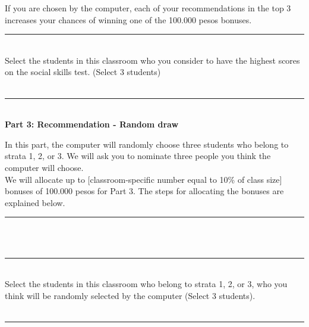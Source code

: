 \documentclass[11pt,a4paper,oneside]{article}
\begin{document}
\noindent If you are chosen by the computer, each of your recommendations in the top 3 increases your chances of winning one of the 100.000 pesos bonuses. \\

\noindent\rule{\textwidth}{0.4pt}\\

\noindent Select the students in this classroom who you consider to have the highest scores on the social skills test. (Select 3 students) \\

\\

\noindent\rule{\textwidth}{0.4pt}\\

\noindent\textbf{Part 3: Recommendation - Random draw}

\noindent In this part, the computer will randomly choose three students who belong to strata 1, 2, or 3. We will ask you to nominate three people you think the computer will choose. \\

\noindent We will allocate up to [classroom-specific number equal to 10\% of class size] bonuses of 100.000 pesos for Part 3. The steps for allocating the bonuses are explained below. \\

\noindent\rule{\textwidth}{0.4pt}\\

 \\

\noindent\rule{\textwidth}{0.4pt}\\

\noindent Select the students in this classroom who belong to strata 1, 2, or 3, who you think will be randomly selected by the computer (Select 3 students). \\

\\

\noindent\rule{\textwidth}{0.4pt}\\
\end{document}
